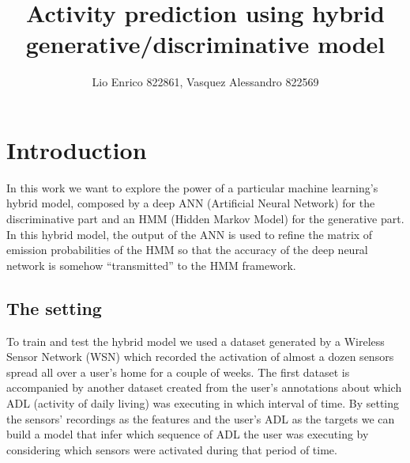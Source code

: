 \documentclass[10pt,a4paper]{article}
\title{Activity prediction using hybrid generative/discriminative model}
\author{Lio Enrico 822861, Vasquez Alessandro 822569}
\begin{document}
	\maketitle
	\newpage
	\section{Introduction}
	In this work we want to explore the power of a particular machine learning's hybrid model, composed by a deep ANN (Artificial Neural Network) for the discriminative part and an HMM (Hidden Markov Model) for the generative part. In this hybrid model, the output of the ANN is used to refine the matrix of emission probabilities of the HMM so that the accuracy of the deep neural network is somehow ``transmitted'' to the HMM framework.
	\subsection{The setting}
	To train and test the hybrid model we used a dataset generated by a Wireless Sensor Network (WSN) which recorded the activation of almost a dozen sensors spread all over a user's home for a couple of weeks. The first dataset is accompanied by another dataset created from the user's annotations about which ADL (activity of daily living) was executing in which interval of time. By setting the sensors' recordings as the features and the user's ADL as the targets we can build a model that infer which sequence of ADL the user was executing by considering which sensors were activated during that period of time. 
	
\end{document}
